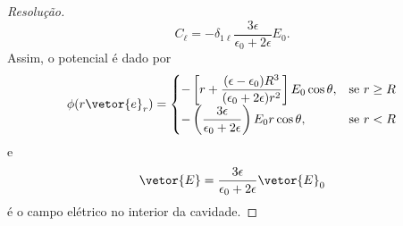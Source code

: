 \begin{proof}[Resolução]
\begin{equation*}
        C_\ell = -\delta_{1\ell}\frac{3\epsilon}{\epsilon_0 + 2 \epsilon}E_0.
    \end{equation*}
    Assim, o potencial é dado por
    \begin{equation*}
        \phi(r\vetor{e}_r) = \begin{cases}
            \displaystyle -\left[r + \frac{(\epsilon - \epsilon_0)R^3}{(\epsilon_0 + 2 \epsilon)r^2}\right]E_0 \cos\theta, &\text{se }r \geq R\\
            \displaystyle -\left(\frac{3 \epsilon}{\epsilon_0 + 2 \epsilon}\right)E_0 r \cos\theta,&\text{se }r < R
        \end{cases}
    \end{equation*}
    e
    \begin{equation*}
        \vetor{E} = \frac{3 \epsilon}{\epsilon_0 + 2 \epsilon} \vetor{E}_0
    \end{equation*}
    é o campo elétrico no interior da cavidade.
\end{proof}
